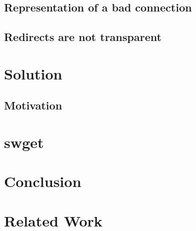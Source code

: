 \subsection{Representation of a bad connection}


\subsection{Redirects are not transparent}

\section{Solution}
\label{sec:solution-saber}

\subsection{Motivation}

\section{swget}
\label{sec:swget-saber}

\section{Conclusion}
\label{sec:conclusion-saber}

\section{Related Work}
\label{sec:related-saber}
